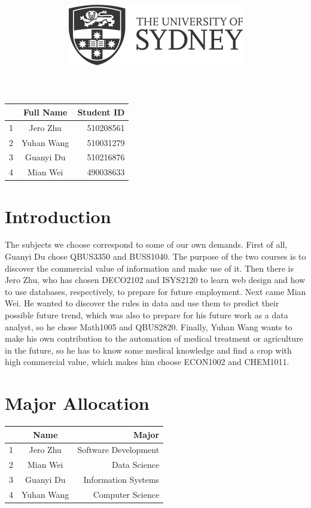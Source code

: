 \documentclass[12pt]{article}
\title{\includegraphics[scale=.5]{usydlogo.png}
\linebreak \\
\noindent \scalebox{1}{\textbf{\helveticafamily INFO1111: Computing 1A Professionalism}}
}
\date{\noindent \scalebox{1}{\textbf{\helveticafamily Semester 1 2021}}}
\author{\noindent \scalebox{1}{\textbf{\helveticafamily Project 2B}}}
\newcommand\helveticafamily{\fontfamily{phv} \selectfont}
\begin{document}
\maketitle
\begin{center}
    \textbf{\noindent \scalebox{1}{\textbf{\helveticafamily Group Number:3}}}
\end{center}


\begin{center}
\begin{tabular}{|l|c|r|}
\hline
  & Full Name & Student ID \\ \hline
1 & Jero Zhu  & 510208561  \\ \hline
2 & Yuhan Wang& 510031279  \\ \hline
3 & Guanyi Du & 510216876  \\ \hline
4 & Mian Wei  & 490038633  \\ \hline
\end{tabular}
\end{center}

\thispagestyle{empty}
\newpage

\tableofcontents %

\setcounter{page}{1}
\newpage
\section{Introduction}
The subjects we choose correspond to some of our own demands. First of all, Guanyi Du chose QBUS3350 and BUSS1040. The purpose of the two courses is to discover the commercial value of information and make use of it. Then there is Jero Zhu, who has chosen DECO2102 and ISYS2120 to learn web design and how to use databases, respectively, to prepare for future employment. Next came Mian Wei. He wanted to discover the rules in data and use them to predict their possible future trend, which was also to prepare for his future work as a data analyst, so he chose Math1005 and QBUS2820. Finally, Yuhan Wang wants to make his own contribution to the automation of medical treatment or agriculture in the future, so he has to know some medical knowledge and find a crop with high commercial value, which makes him choose ECON1002 and CHEM1011.

\newpage
\section{Major Allocation}

\begin{center}
\begin{tabular}{|l|c|r|}
\hline
  & Name      & Major                \\ \hline
1 & Jero Zhu  & Software Development \\ \hline
2 & Mian Wei  & Data Science         \\ \hline
3 & Guanyi Du & Information Systems  \\ \hline
4 & Yuhan Wang & Computer Science    \\ \hline
\end{tabular}
\end{center}
\end{document}
